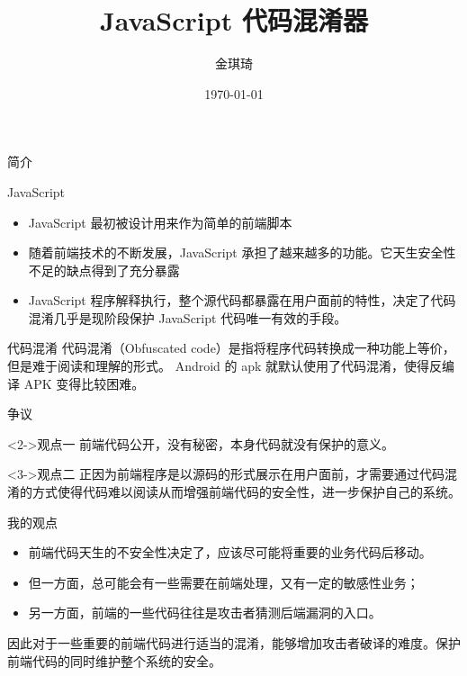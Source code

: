 \documentclass[presentation]{beamer}
\author{金琪琦}
\date{\today}
\title{JavaScript 代码混淆器}
\begin{document}
\maketitle

\begin{frame}[label=sec-1]{简介}
\begin{block}{JavaScript}
\begin{itemize}
\item JavaScript 最初被设计用来作为简单的前端脚本
\item 随着前端技术的不断发展，JavaScript 承担了越来越多的功能。它天生安全性不足的缺点得到了充分暴露
\item JavaScript 程序解释执行，整个源代码都暴露在用户面前的特性，决定了代码混淆几乎是现阶段保护 JavaScript 代码唯一有效的手段。
\end{itemize}
\end{block}
\begin{block}{代码混淆}
代码混淆（Obfuscated code）是指将程序代码转换成一种功能上等价，但是难于阅读和理解的形式。
Android 的 apk 就默认使用了代码混淆，使得反编译 APK 变得比较困难。
\end{block}
\end{frame}
\begin{frame}[label=sec-2]{争议}
\begin{block}<2->{观点一}
前端代码公开，没有秘密，本身代码就没有保护的意义。
\end{block}
\begin{block}<3->{观点二}
正因为前端程序是以源码的形式展示在用户面前，才需要通过代码混淆的方式使得代码难以阅读从而增强前端代码的安全性，进一步保护自己的系统。
\end{block}
\end{frame}
\begin{frame}[label=sec-3]{我的观点}
\begin{block}{}
\begin{itemize}
\item 前端代码天生的不安全性决定了，应该尽可能将重要的业务代码后移动。
\item 但一方面，总可能会有一些需要在前端处理，又有一定的敏感性业务；
\item 另一方面，前端的一些代码往往是攻击者猜测后端漏洞的入口。
\end{itemize}
\end{block}
\begin{block}{}
因此对于一些重要的前端代码进行适当的混淆，能够增加攻击者破译的难度。保护前端代码的同时维护整个系统的安全。
\end{block}
\end{frame}
\end{document}
